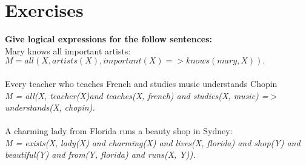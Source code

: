 \documentclass[12pt]{article}
\begin{document}
\maketitle

\section{Exercises}

\textbf{Give logical expressions for the follow sentences:}\\
Mary knows all important artists:\\
$M = all(X, artists(X), important(X) => knows(mary, X)).$\\
\\
Every teacher who teaches French and studies music understands Chopin\\
\emph{M = all(X, teacher(X)and teaches(X, french) and studies(X, music) =$>$ understands(X, chopin).}\\
\\
A charming lady from Florida runs a beauty shop in Sydney:\\
\emph{M = exists(X, lady(X) and charming(X) and lives(X, florida) and shop(Y) and beautiful(Y) and from(Y, florida) and runs(X, Y)).}
\end{document}
